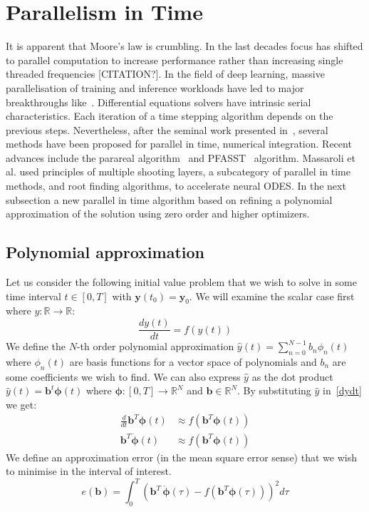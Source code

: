 \documentclass[11pt]{article}
\begin{document}
    \section{Parallelism in Time}
    It is apparent that Moore's law is crumbling.
    In the last decades focus has shifted to parallel computation to increase performance rather than increasing single
    threaded frequencies [CITATION?].
    In the field of deep learning, massive parallelisation of training and inference workloads have led to major
    breakthroughs like~\cite{vaswani2017attention}.
    Differential equations solvers have intrinsic serial characteristics.
    Each iteration of a time stepping algorithm depends on the previous steps.
    Nevertheless, after the seminal work presented in~\cite{nievergelt1964parallel}, several methods have been proposed
    for parallel in time, numerical integration.
    Recent advances include the parareal algorithm~\cite{maday2002parareal} and PFASST~\cite{emmett2012toward} algorithm.
    Massaroli et al. \cite{massaroli2021differentiable} used principles of multiple shooting layers,
    a subcategory of parallel in time methods, and root finding algorithms, to accelerate neural ODES.
    In the next subsection a new parallel in time algorithm based on refining a polynomial approximation of the solution
    using zero order and higher optimizers.

    \subsection{Polynomial approximation}
    Let us consider the following initial value problem that we wish to solve in some time interval
    $t \in [0 , T]$ with $\pmb{y} (t_0)= \pmb{y}_0$.
    We will examine the scalar case first where $y : \mathbb{R} \to \mathbb{R}$:
    \begin{equation}
        \frac{d y(t)}{dt} = f(y(t)) \label{dydt}
    \end{equation}
    We define the $N$-th order polynomial approximation  $\hat{y}(t)=\sum_{n=0}^{N-1} b_n \phi_n(t) $  where $ \phi_n(t) $ are basis functions
    for a vector space of polynomials and $b_n$ are some coefficients we wish to find.
    We can also express $\hat{y}$ as the dot product $\hat{y}(t)=  \pmb{b}^t \pmb{\phi}(t)$ where
    $\pmb{\phi} : [0,T] \to \mathbb{R}^N$ and $\pmb{b} \in \mathbb{R}^N$.
    By substituting $\hat{y}$ in~\eqref{dydt} we get:
    \begin{align}
        \frac{d}{dt}  \pmb{b}^T \pmb{\phi}(t)   &\approx f( \pmb{b}^T \pmb{\phi}(t) ) \label{dPhidt}
        \\
        \pmb{b}^T \pmb{\dot{\phi}}(t)  &\approx f( \pmb{b}^T \pmb{\phi}(t)) \label{dphi_fphi}
    \end{align}
    We define an approximation error (in the mean square error sense) that we wish to minimise in the interval of interest.
    \begin{equation}
        \label{eq:error_wrt_B}
        e(\pmb{b}) = \int_0^T
        \left(
        \pmb{b}^T  \, \pmb{\dot{\phi}}(\tau) - f( \pmb{b}^T \pmb{\phi}(\tau)   )
        \right)^2
        d\tau
    \end{equation}
\end{document}
